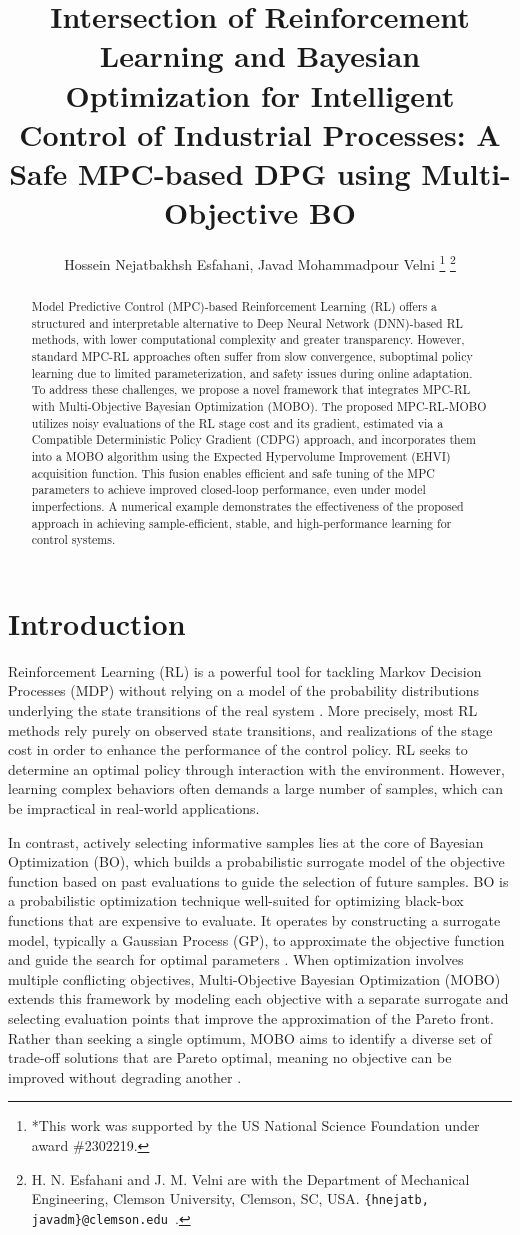 \documentclass[10pt,twocolumn,twoside]{IEEEtran}
\title{\LARGE \bf
Intersection of Reinforcement Learning and Bayesian Optimization for Intelligent Control of Industrial Processes: A Safe MPC-based DPG using Multi-Objective BO}
\author{Hossein Nejatbakhsh Esfahani, Javad Mohammadpour Velni%
\thanks{*This work was supported by the US National Science Foundation under award \#2302219.}%
\thanks{H. N. Esfahani and J. M. Velni are with the Department of Mechanical Engineering, Clemson University, Clemson, SC, USA.
		{\tt\small \{hnejatb, javadm\}@clemson.edu%
		}.
}}
\begin{document}
\maketitle

\begin{abstract}
Model Predictive Control (MPC)-based Reinforcement Learning (RL) offers a structured and interpretable alternative to Deep Neural Network (DNN)-based RL methods, with lower computational complexity and greater transparency. However, standard MPC-RL approaches often suffer from slow convergence, suboptimal policy learning due to limited parameterization, and safety issues during online adaptation. To address these challenges, we propose a novel framework that integrates MPC-RL with Multi-Objective Bayesian Optimization (MOBO). The proposed MPC-RL-MOBO utilizes noisy evaluations of the RL stage cost and its gradient, estimated via a Compatible Deterministic Policy Gradient (CDPG) approach, and incorporates them into a MOBO algorithm using the Expected Hypervolume Improvement (EHVI) acquisition function. This fusion enables efficient and safe tuning of the MPC parameters to achieve improved closed-loop performance, even under model imperfections. A numerical example demonstrates the effectiveness of the proposed approach in achieving sample-efficient, stable, and high-performance learning for control systems.
\end{abstract}


\section{Introduction}
Reinforcement Learning (RL) is a powerful tool for tackling Markov Decision Processes (MDP) without relying on a model of the probability distributions underlying the state transitions of the real system \cite{sutton}. More precisely, most RL methods rely purely on observed state transitions, and realizations of the stage cost in order to enhance the performance of the control policy. RL seeks to determine an optimal policy through interaction with the environment. However, learning complex behaviors often demands a large number of samples, which can be impractical in real-world applications.

In contrast, actively selecting informative samples lies at the core of Bayesian Optimization (BO), which builds a probabilistic surrogate model of the objective function based on past evaluations to guide the selection of future samples. BO is a probabilistic optimization technique well-suited for optimizing black-box functions that are expensive to evaluate. It operates by constructing a surrogate model, typically a Gaussian Process (GP), to approximate the objective function and guide the search for optimal parameters \cite{7352306}. When optimization involves multiple conflicting objectives, Multi-Objective Bayesian Optimization (MOBO) extends this framework by modeling each objective with a separate surrogate and selecting evaluation points that improve the approximation of the Pareto front. Rather than seeking a single optimum, MOBO aims to identify a diverse set of trade-off solutions that are Pareto optimal, meaning no objective can be improved without degrading another \cite{mobo1,mobo2}.
\end{document}

